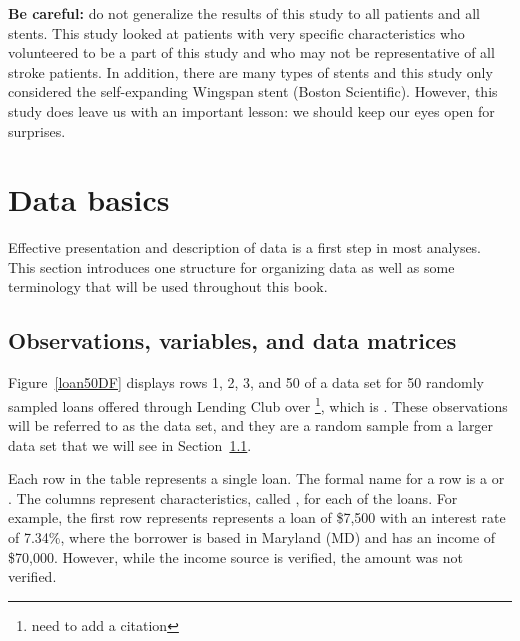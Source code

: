 \textbf{Be careful:} do not generalize the results of this study to all patients and all stents. This study looked at patients with very specific characteristics who volunteered to be a part of this study and who may not be representative of all stroke patients. In addition, there are many types of stents and this study only considered the self-expanding Wingspan stent (Boston Scientific). However, this study does leave us with an important lesson: we should keep our eyes open for surprises.


\section[Data basics]{Data basics  }
\label{dataBasics}

Effective presentation and description of data is a first step in most analyses. This section introduces one structure for organizing data as well as some terminology that will be used throughout this book.

\subsection{Observations, variables, and data matrices}



Figure~\ref{loan50DF} displays rows 1, 2, 3, and 50 of a data set
for 50 randomly sampled loans offered through Lending
Club over \footnote{need
to add a citation},
which is .
These observations will be referred to as the  data set, and they are a random sample from a larger data set that we will see in Section~\ref{}.


Each row in the table represents a single loan.
The formal name for a row is a 
or .
The columns represent characteristics,
called ,
for each of the loans.
For example, the first row represents represents a loan of \$7,500 with an interest rate of 7.34\%, where the borrower is based in Maryland (MD) and has an income of \$70,000. However, while the income source is verified, the amount was not verified.

